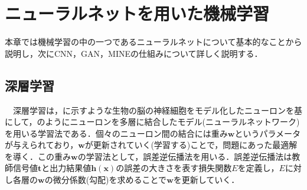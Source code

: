\chapter{ニューラルネットを用いた機械学習}
本章では機械学習の中の一つであるニューラルネットについて基本的なことから説明し，次にCNN，GAN，MINEの仕組みについて詳しく説明する．

\section{深層学習}
　深層学習は，に示すような生物の脳の神経細胞をモデル化したニューロンを基にして，のようにニューロンを多層に結合したモデル(ニューラルネットワーク)を用いる学習法である．個々のニューロン間の結合には重み$\bm{w}$というパラメータが与えられており，$\bm{w}$が更新されていく(学習する)ことで，問題にあった最適解を導く．この重み$\bm{w}$の学習法として，誤差逆伝播法を用いる．誤差逆伝播法は教師信号値$\bm{t}$と出力結果値$\bm{h(x)}$の誤差の大きさを表す損失関数$E$を定義し，$E$に対し各層の$\bm{w}$の微分係数(勾配)を求めることで$\bm{w}$を更新していく．\\
